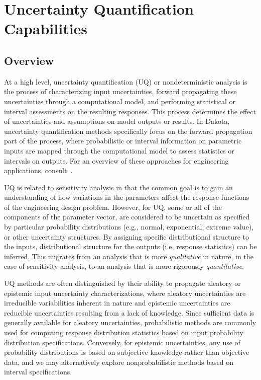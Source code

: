 \chapter{Uncertainty Quantification Capabilities}\label{uq}

\section{Overview}\label{uq:overview}

At a high level, uncertainty quantification (UQ) or nondeterministic
analysis is the process of characterizing input uncertainties, forward
propagating these uncertainties through a computational model, and
performing statistical or interval assessments on the resulting
responses. This process determines the effect of uncertainties and
assumptions on model outputs or results. In Dakota, uncertainty
quantification methods specifically focus on the forward propagation
part of the process, where probabilistic or interval information on
parametric inputs are mapped through the computational model to assess
statistics or intervals on outputs. For an overview of these
approaches for engineering applications, consult~\cite{Hal00}.

UQ is related to sensitivity analysis in that the common goal is to
gain an understanding of how variations in the parameters affect the
response functions of the engineering design problem. However, for UQ,
some or all of the components of the parameter vector, are considered
to be uncertain as specified by particular probability distributions
(e.g., normal, exponential, extreme value), or other uncertainty
structures. By assigning specific distributional structure to the
inputs, distributional structure for the outputs (i.e, response
statistics) can be inferred.  This migrates from an analysis that is
more {\em qualitative} in nature, in the case of sensitivity analysis,
to an analysis that is more rigorously {\em quantitative}.

UQ methods are often distinguished by their ability to propagate
aleatory or epistemic input uncertainty characterizations, where
aleatory uncertainties are irreducible variabilities inherent in
nature and epistemic uncertainties are reducible uncertainties
resulting from a lack of knowledge. Since sufficient data is generally
available for aleatory uncertainties, probabilistic methods are
commonly used for computing response distribution statistics based on
input probability distribution specifications. Conversely, for
epistemic uncertainties, any use of probability distributions is based
on subjective knowledge rather than objective data, and we may
alternatively explore nonprobabilistic methods based on interval
specifications.

